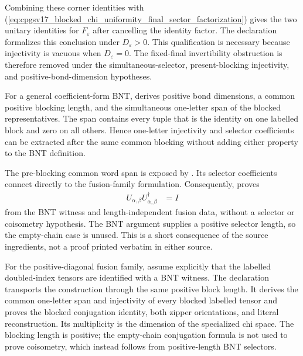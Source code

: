 \documentclass{article}
\begin{document}
Combining these corner identities with
(\ref{eq:cpgsv17_blocked_chi_uniformity_final_sector_factorization}) gives
the two unitary identities for $F_\varepsilon$ after cancelling the identity
factor. The declaration
formalizes this conclusion under $D_\varepsilon>0$. This qualification is
necessary because injectivity is vacuous when $D_\varepsilon=0$. The
fixed-final invertibility obstruction is therefore removed under the
simultaneous-selector, present-blocking injectivity, and
positive-bond-dimension hypotheses.

For a general coefficient-form BNT,
derives positive bond dimensions, a common positive blocking length, and the
simultaneous one-letter span of the blocked representatives. The span contains
every tuple that is the identity on one labelled block and zero on all others.
Hence one-letter injectivity and selector coefficients can be extracted after
the same common blocking without adding either property to the BNT definition.

The pre-blocking common word span is exposed by
.
Its selector coefficients connect directly to the fusion-family formulation.
Consequently,
proves
\begin{align}
    U_{\alpha,\beta}U_{\alpha,\beta}^{\dagger}
        &= I
\label{eq:cpgsv17_blocked_chi_uniformity_bnt_derived_coisometry}
\end{align}
from the BNT witness and length-independent fusion data, without a selector
or coisometry hypothesis. The BNT argument supplies a positive selector
length, so the empty-chain case is unused. This is a short consequence of the
source ingredients, not a proof printed verbatim in either source.

For the positive-diagonal fusion family, assume explicitly that the labelled
doubled-index tensors are identified with a BNT witness. The declaration
transports the construction through the same positive block length. It
derives the common one-letter span and injectivity of every blocked labelled
tensor and proves the blocked conjugation identity, both zipper orientations,
and literal reconstruction. Its multiplicity is the dimension of the
specialized chi space. The blocking length is positive; the empty-chain
conjugation formula is not used to prove coisometry, which instead follows
from positive-length BNT selectors.
\end{document}
